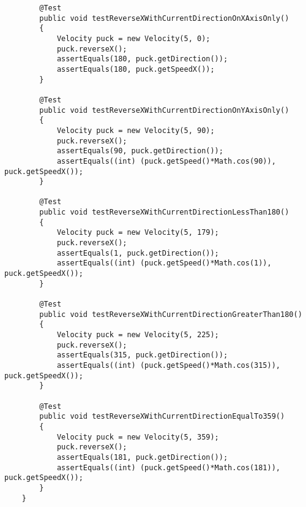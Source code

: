 \documentclass{article}
\begin{document}
\begin{lstlisting}
        @Test
        public void testReverseXWithCurrentDirectionOnXAxisOnly()
        {
            Velocity puck = new Velocity(5, 0);
            puck.reverseX();
            assertEquals(180, puck.getDirection());
            assertEquals(180, puck.getSpeedX());
        }

        @Test
        public void testReverseXWithCurrentDirectionOnYAxisOnly()
        {
            Velocity puck = new Velocity(5, 90);
            puck.reverseX();
            assertEquals(90, puck.getDirection());
            assertEquals((int) (puck.getSpeed()*Math.cos(90)), puck.getSpeedX());
        }

        @Test
        public void testReverseXWithCurrentDirectionLessThan180()
        {
            Velocity puck = new Velocity(5, 179);
            puck.reverseX();
            assertEquals(1, puck.getDirection());
            assertEquals((int) (puck.getSpeed()*Math.cos(1)), puck.getSpeedX());
        }

        @Test
        public void testReverseXWithCurrentDirectionGreaterThan180()
        {
            Velocity puck = new Velocity(5, 225);
            puck.reverseX();
            assertEquals(315, puck.getDirection());
            assertEquals((int) (puck.getSpeed()*Math.cos(315)), puck.getSpeedX());
        }

        @Test
        public void testReverseXWithCurrentDirectionEqualTo359()
        {
            Velocity puck = new Velocity(5, 359);
            puck.reverseX();
            assertEquals(181, puck.getDirection());
            assertEquals((int) (puck.getSpeed()*Math.cos(181)), puck.getSpeedX());
        }
    }
\end{lstlisting}
\end{document}
